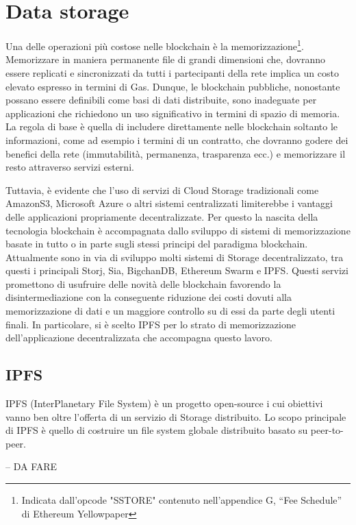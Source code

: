 \section{Data storage}

Una delle operazioni più costose nelle blockchain è la memorizzazione\footnote{Indicata dall'opcode "SSTORE" contenuto nell'appendice G, “Fee Schedule” di Ethereum Yellowpaper}. Memorizzare in maniera permanente file di grandi dimensioni che, dovranno essere replicati e sincronizzati da tutti i partecipanti della rete implica un costo elevato espresso in termini di Gas. Dunque, le blockchain pubbliche, nonostante possano essere definibili come basi di dati distribuite, sono inadeguate per applicazioni che richiedono un uso significativo in termini di spazio di memoria. La regola di base è quella di includere direttamente nelle blockchain soltanto le informazioni, come ad esempio i termini di un contratto, che dovranno godere dei benefici della rete (immutabilità, permanenza, trasparenza ecc.) e memorizzare il resto attraverso servizi esterni.

Tuttavia, è evidente che l'uso di servizi di Cloud Storage tradizionali come AmazonS3, Microsoft Azure o altri sistemi centralizzati limiterebbe i vantaggi delle applicazioni propriamente decentralizzate. Per questo la nascita della tecnologia blockchain è accompagnata dallo sviluppo di sistemi di memorizzazione basate in tutto o in parte sugli stessi principi del paradigma blockchain. Attualmente sono in via di sviluppo molti sistemi di Storage decentralizzato, tra questi i principali Storj, Sia, BigchanDB, Ethereum Swarm e IPFS.
Questi servizi promettono di usufruire delle novità delle blockchain favorendo la disintermediazione con la conseguente riduzione dei costi dovuti alla memorizzazione di dati e un maggiore controllo su di essi da parte degli utenti finali. In particolare, si è scelto IPFS per lo strato di memorizzazione dell'applicazione decentralizzata che accompagna questo lavoro.

\subsection{IPFS}

IPFS (InterPlanetary File System) è un progetto open-source i cui obiettivi vanno ben oltre l'offerta di un servizio di Storage distribuito. Lo scopo principale di IPFS è quello di costruire un file system globale distribuito basato su peer-to-peer.

-- DA FARE